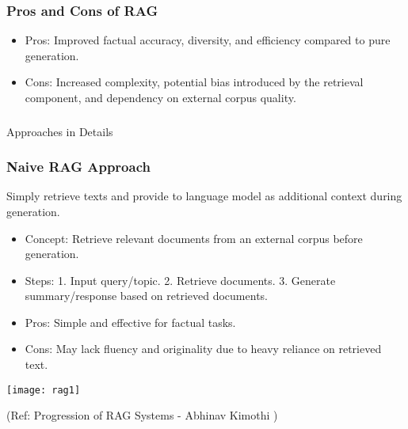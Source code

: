 \begin{frame}[fragile]\frametitle{Pros and Cons of RAG}

\begin{itemize}
\item Pros: Improved factual accuracy, diversity, and efficiency compared to pure generation.
\item Cons: Increased complexity, potential bias introduced by the retrieval component, and dependency on external corpus quality.
\end{itemize}	

\end{frame}

\begin{frame}[fragile]\frametitle{}
\begin{center}
{\Large Approaches in Details}
\end{center}
\end{frame}

\begin{frame}[fragile]\frametitle{Naive RAG Approach}

Simply retrieve texts and provide to language model as additional context during generation.

\begin{itemize}
\item Concept: Retrieve relevant documents from an external corpus before generation.
\item Steps: 1. Input query/topic. 2. Retrieve documents. 3. Generate summary/response based on retrieved documents.
\item Pros: Simple and effective for factual tasks.
\item Cons: May lack fluency and originality due to heavy reliance on retrieved text.
\end{itemize}	

\begin{center}
\texttt{[image: rag1]}

{\tiny (Ref: Progression of RAG Systems - Abhinav Kimothi )}
\end{center}		

\end{frame}

